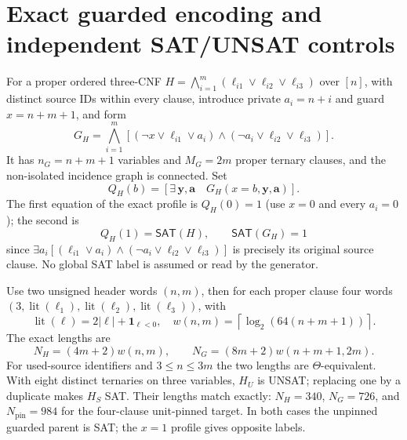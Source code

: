 \documentclass[11pt]{article}
\newcommand{\SAT}{\mathsf{SAT}}
\begin{document}
\section{Exact guarded encoding and independent SAT/UNSAT controls}
For a proper ordered three-CNF $H=\bigwedge_{i=1}^{m}(\ell_{i1}\vee\ell_{i2}\vee\ell_{i3})$ over $[n]$, with distinct source IDs within every clause, introduce private $a_i=n+i$ and guard $x=n+m+1$, and form
\begin{equation}\label{eq:guard}
G_H=\bigwedge_{i=1}^{m}
\left[(\neg x\vee\ell_{i1}\vee a_i)
\wedge(\neg a_i\vee\ell_{i2}\vee\ell_{i3})\right].
\end{equation}
It has $n_G=n+m+1$ variables and $M_G=2m$ proper ternary clauses, and the non-isolated incidence graph is connected. Set
\[
Q_H(b)=\left[\exists\,\mathbf y,\mathbf a\quad G_H(x=b,\mathbf y,\mathbf a)\right].
\]
The first equation of the exact profile is $Q_H(0)=1$ (use $x=0$ and every $a_i=0$); the second is
\[
Q_H(1)=\SAT(H),\qquad \SAT(G_H)=1
\]
since $\exists a_i[(\ell_{i1}\vee a_i)\wedge(\neg a_i\vee\ell_{i2}\vee\ell_{i3})]$ is precisely its original source clause. No global SAT label is assumed or read by the generator.

Use two unsigned header words $(n,m)$, then for each proper clause four words $(3,\operatorname{lit}(\ell_1),\operatorname{lit}(\ell_2),\operatorname{lit}(\ell_3))$, with
\[
\operatorname{lit}(\ell)=2|\ell|+\mathbf1_{\ell<0},\quad
w(n,m)=\left\lceil\log_2(64(n+m+1))\right\rceil.
\]
The exact lengths are
\[
N_H=(4m+2)w(n,m),\qquad
N_G=(8m+2)w(n+m+1,2m).
\]
For used-source identifiers and $3\le n\le3m$ the two lengths are $\Theta$-equivalent. With eight distinct ternaries on three variables, $H_U$ is UNSAT; replacing one by a duplicate makes $H_S$ SAT. Their lengths match exactly: $N_H=340$, $N_G=726$, and $N_{\mathrm{pin}}=984$ for the four-clause unit-pinned target. In both cases the unpinned guarded parent is SAT; the $x=1$ profile gives opposite labels.
\end{document}
